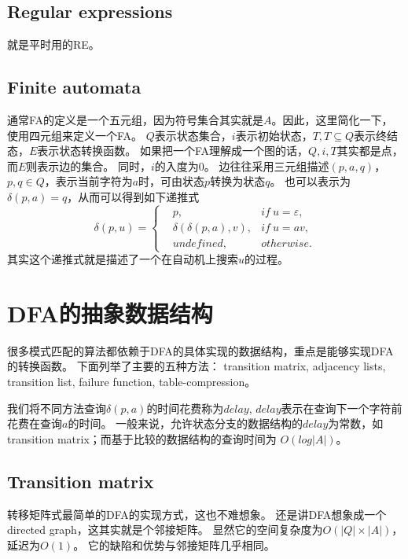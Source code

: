 \documentclass[UTF8]{ctexart}
\theoremstyle{definition}
\theoremstyle{remark}
\numberwithin{equation}{subsection}
\begin{document}
\subsection{Regular expressions}

	就是平时用的RE。
	
\subsection{Finite automata}
	
	通常FA的定义是一个五元组，因为符号集合其实就是$A$。因此，这里简化一下，使用四元组来定义一个FA。
	$Q$表示状态集合，$i$表示初始状态，$T, T \subseteq Q$表示终结态，$E$表示状态转换函数。
	如果把一个FA理解成一个图的话，$Q, i, T$其实都是点，而$E$则表示边的集合。
	同时，$i$的入度为0。
	边往往采用三元组描述$(p, a, q)$，$p,q \in Q$，表示当前字符为$a$时，可由状态$p$转换为状态$q$。
	也可以表示为$\delta(p, a)=q$，从而可以得到如下递推式
	\[
		\delta(p, u) =
		\left\{
		\begin{aligned}
			&p,		  &if\ u=\varepsilon,	\\
			&\delta(\delta(p, a), v), &if\ u=av,	\\
			&undefined,  &otherwise.
		\end{aligned}
		\right .
	\]
	其实这个递推式就是描述了一个在自动机上搜索$u$的过程。
	
\section{DFA的抽象数据结构}

	很多模式匹配的算法都依赖于DFA的具体实现的数据结构，重点是能够实现DFA的转换函数。
	下面列举了主要的五种方法：
	transition matrix, adjacency lists, transition list, failure function, table-compression。
	
	我们将不同方法查询$\delta(p,a)$的时间花费称为$delay$, $delay$表示在查询下一个字符前花费在查询$a$的时间。
	一般来说，允许状态分支的数据结构的$delay$为常数，如transition matrix；而基于比较的数据结构的查询时间为
	$O(log |A|)$。
	
\subsection{Transition matrix}

	转移矩阵式最简单的DFA的实现方式，这也不难想象。
	还是讲DFA想象成一个directed graph，这其实就是个邻接矩阵。
	显然它的空间复杂度为$O(|Q| \times |A|)$，延迟为$O(1)$。
	它的缺陷和优势与邻接矩阵几乎相同。
	
\end{document}
